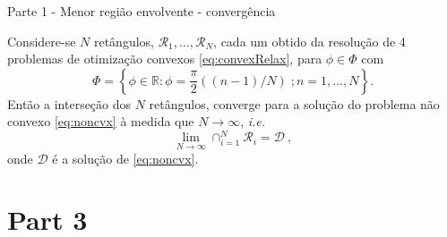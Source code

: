 \documentclass{beamer}					%
\begin{document}
\begin{frame}{Parte 1  - Menor região envolvente - convergência}
	\begin{theorem}
		Considere-se $N$ retângulos, $\mathcal{R}_1,\ldots,\mathcal{R}_N$, cada um obtido da resolução de 4 problemas de otimização convexos \eqref{eq:convexRelax}, para $\phi \in \Phi$ com 
		\begin{equation*}
		\Phi = \left \{\phi \in \mathbb{R} : \phi = \frac{\pi}{2}((n-1)/N)\;; n = 1,\ldots,N\right\}.
		\end{equation*}
		Então a interseção dos $N$ retângulos, converge para a solução do problema não convexo \eqref{eq:noncvx} à medida que $N\rightarrow \infty$, \textit{i.e.}
		\begin{equation*}
		\lim_{N\rightarrow \infty} \cap_{i=1}^N\mathcal{R}_i = \mathcal{D}\:,
		\end{equation*}
		onde $\mathcal{D}$ é a solução de \eqref{eq:noncvx}.
	\end{theorem}
\end{frame}

\section{Part 3}
\end{document}
